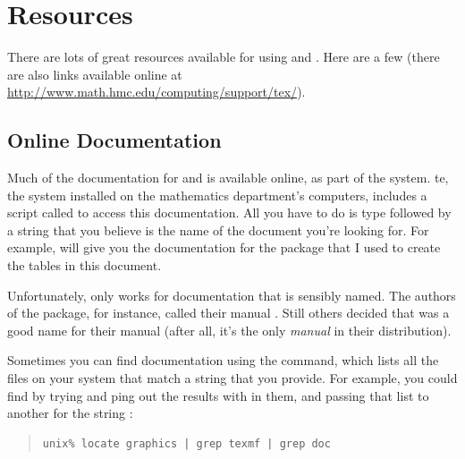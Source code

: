 
\chapter{Resources}

There are lots of great resources available for using \tex and \latex.
Here are a few (there are also links available online at\\
\url{http://www.math.hmc.edu/computing/support/tex/}).


\section{Online Documentation}%
\label{sec:online-docs}

Much of the documentation for \tex and \latex is available online, as
part of the \tex system.  te\tex, the \tex system installed on the
mathematics department's computers, includes a script called
 to access this documentation.  All you have to do is
type  followed by a string that you believe is the name
of the document you're looking for.  For example,  will give you the documentation for the 
package that I used to create the tables in this document.

Unfortunately,  only works for documentation that is
sensibly named.  The authors of the  package, for
instance, called their manual .  Still others decided
that  was a good name for their manual (after all, it's
the only \emph{manual} in their distribution).

Sometimes you can find documentation using the  command,
which lists all the files on your system that match a string that you
provide.  For example, you could find  by trying
 and ping out the results with
 in them, and passing that list to another  for
the string :
\begin{quote}
\begin{verbatim}
unix% locate graphics | grep texmf | grep doc
\end{verbatim}
\end{quote}

